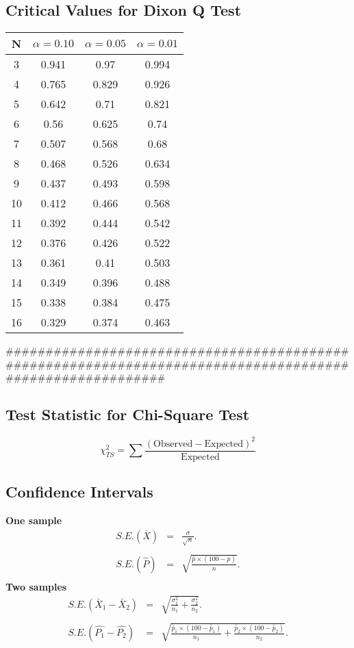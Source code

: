 \subsection*{Critical Values for Dixon Q Test}
{
	\Large
	\begin{center}
		\begin{tabular}{|c|c|c|c|}
			\hline  N  & $\alpha=0.10$  & $\alpha=0.05$  & $\alpha=0.01$  \\ \hline
			3  & 0.941 & 0.97  & 0.994 \\ \hline
			4  & 0.765 & 0.829 & 0.926 \\ \hline
			5  & 0.642 & 0.71  & 0.821 \\ \hline
			6  & 0.56  & 0.625 & 0.74  \\ \hline
			7  & 0.507 & 0.568 & 0.68  \\ \hline
			8  & 0.468 & 0.526 & 0.634 \\ \hline
			9  & 0.437 & 0.493 & 0.598 \\ \hline
			10 & 0.412 & 0.466 & 0.568 \\ \hline
			11 & 0.392 & 0.444 & 0.542 \\ \hline
			12 & 0.376 & 0.426 & 0.522 \\ \hline
			13 & 0.361 & 0.41  & 0.503 \\ \hline
			14 & 0.349 & 0.396 & 0.488 \\ \hline
			15 & 0.338 & 0.384 & 0.475 \\ \hline
			16 & 0.329 & 0.374 & 0.463 \\ \hline
		\end{tabular} 
	\end{center}
}

##########################################################################################################
\subsection*{Test Statistic for Chi-Square Test}
{
\Large
\[ \chi^2_{TS} = \sum \frac{(\mbox{Observed} -\mbox{Expected} )^2}{\mbox{Expected} }\]
}


\subsection*{Confidence Intervals}
{\bf One sample}
\begin{eqnarray*} S.E.(\bar{X})&=&\frac{\sigma}{\sqrt{n}}.\\\\
S.E.(\hat{P})&=&\sqrt{\frac{\hat{p}\times(100-\hat{p})}{n}}.\\
\end{eqnarray*}
{\bf Two samples}
\begin{eqnarray*}
S.E.(\bar{X}_1-\bar{X}_2)&=&\sqrt{\frac{\sigma^2_1}{n_1}+\frac{\sigma_2^2}{n_2}}.\\\\
S.E.(\hat{P_1}-\hat{P_2})&=&\sqrt{\frac{\hat{p}_1\times(100-\hat{p}_1)}{n_1}+\frac{\hat{p}_2\times(100-\hat{p}_2)}{n_2}}.\\\\
\end{eqnarray*}
